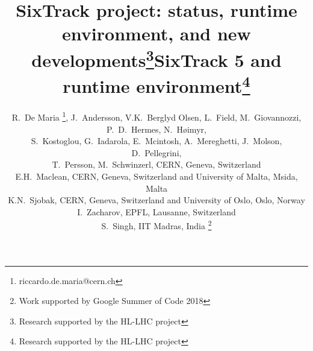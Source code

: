 \documentclass[a4paper,
              ]{jacow}
\begin{document}
\title{SixTrack project: status, runtime environment, and new developments\thanks{Research supported by the HL-LHC project}}

\title{SixTrack 5 and runtime environment\thanks{Research supported by the HL-LHC project}}

\author{
R.~De Maria \thanks{riccardo.de.maria@cern.ch},
J.~Andersson,
V.K.~Berglyd Olsen,
L.~Field,
M.~Giovannozzi,
P.~D.~Hermes,
N.~H\o imyr, \\
S.~Kostoglou,
G.~Iadarola,
E.~Mcintosh,
A.~Mereghetti,
J.~Molson,
D.~Pellegrini,\\
T.~Persson,
M.~Schwinzerl,
CERN, Geneva, Switzerland \\
E.H.~Maclean, CERN, Geneva, Switzerland and University of Malta, Msida, Malta\\
K.N.~Sjobak, CERN, Geneva, Switzerland and University of Oslo, Oslo, Norway\\
I.~Zacharov, EPFL, Lausanne, Switzerland \\
S.~Singh, IIT Madras, India \thanks{Work supported by Google Summer of Code 2018}
}
\maketitle

\end{document}
